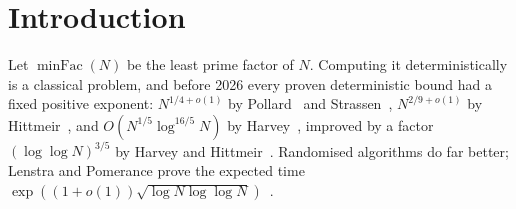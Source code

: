 \documentclass[10pt]{amsart}
\theoremstyle{plain}
\theoremstyle{definition}
\theoremstyle{remark}
\numberwithin{equation}{section}
\newcommand{\minFac}{\operatorname{minFac}}
\begin{document}
\maketitle

\section{Introduction}\label{sec:intro}

Let $\minFac(N)$ be the least prime factor of $N$. Computing it deterministically is a classical
problem, and before 2026 every proven deterministic bound had a fixed positive exponent:
$N^{1/4+o(1)}$ by Pollard~\cite{Pol74} and Strassen~\cite{Str77}, $N^{2/9+o(1)}$ by
Hittmeir~\cite{Hit21}, and $O(N^{1/5}\log^{16/5}N)$ by Harvey~\cite{Har21}, improved by a factor
$(\log\log N)^{3/5}$ by Harvey and Hittmeir~\cite{HH22}. Randomised algorithms do far better; Lenstra
and Pomerance prove the expected time $\exp((1+o(1))\sqrt{\log N\log\log N})$~\cite{LP92}.
\end{document}
